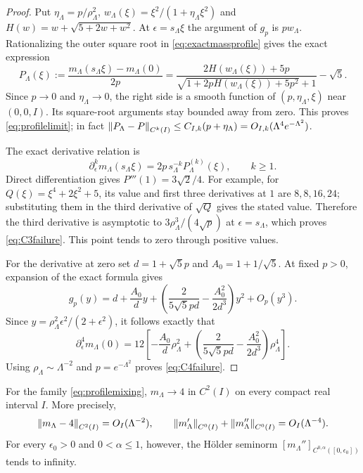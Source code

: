 \begin{proof}
Put $\eta_\Lambda=p/\rho_\Lambda^2$,
$w_\Lambda(\xi)=\xi^2/(1+\eta_\Lambda\xi^2)$ and
$H(w)=w+\sqrt{5+2w+w^2}$.
At $\epsilon=s_\Lambda\xi$ the argument of $g_p$ is $pw_\Lambda$.
Rationalizing the outer square root in \eqref{eq:exactmassprofile}
gives the exact expression
\begin{equation}\label{eq:rationalprofile}
 P_\Lambda(\xi):=\frac{m_\Lambda(s_\Lambda\xi)-m_\Lambda(0)}{2p}
 =\frac{2H(w_\Lambda(\xi))+5p}
        {\sqrt{1+2pH(w_\Lambda(\xi))+5p^2}+1}-\sqrt5.
\end{equation}
Since $p\to0$ and $\eta_\Lambda\to0$, the right side is a smooth
function of $(p,\eta_\Lambda,\xi)$ near $(0,0,I)$.
Its square-root arguments stay bounded away from zero.
This proves \eqref{eq:profilelimit}; in fact
$\left\lVert P_\Lambda-P\right\rVert_{C^k(I)}
\leq C_{I,k}(p+\eta_\Lambda)=O_{I,k}(\Lambda^4e^{-\Lambda^2})$.

The exact derivative relation is
\[
 \partial_\epsilon^k m_\Lambda(s_\Lambda\xi)
 =2p\,s_\Lambda^{-k}P_\Lambda^{(k)}(\xi),\qquad k\geq1.
\]
Direct differentiation gives $P'''(1)=3\sqrt2/4$.
For example, for $Q(\xi)=\xi^4+2\xi^2+5$, its value and first three
derivatives at $1$ are $8,8,16,24$; substituting them in the third
derivative of $\sqrt Q$ gives the stated value.
Therefore the third derivative is asymptotic to
$3\rho_\Lambda^3/(4\sqrt p)$ at $\epsilon=s_\Lambda$, which proves
\eqref{eq:C3failure}. This point tends to zero through positive values.

For the derivative at zero set $d=1+\sqrt5p$ and $A_0=1+1/\sqrt5$.
At fixed $p>0$, expansion of the exact formula gives
\[
 g_p(y)=d+\frac{A_0}{d}y+
 \left(\frac{2}{5\sqrt5pd}-\frac{A_0^2}{2d^3}\right)y^2+O_p(y^3).
\]
Since $y=\rho_\Lambda^2\epsilon^2/(2+\epsilon^2)$, it follows exactly that
\[
 \partial_\epsilon^4m_\Lambda(0)
 =12\left[-\frac{A_0}{d}\rho_\Lambda^2+
 \left(\frac{2}{5\sqrt5pd}-\frac{A_0^2}{2d^3}\right)\rho_\Lambda^4\right].
\]
Using $\rho_\Lambda\sim\Lambda^{-2}$ and $p=e^{-\Lambda^2}$ proves
\eqref{eq:C4failure}.
\end{proof}

\begin{corollary}\label{cor:sharpregularity}
For the family \eqref{eq:profilemixing}, $m_\Lambda\to4$ in $C^2(I)$
on every compact real interval $I$. More precisely,
\[
 \left\lVert m_\Lambda-4\right\rVert_{C^2(I)}=O_I(\Lambda^{-2}),\qquad
 \left\lVert m_\Lambda'\right\rVert_{C^0(I)}+\left\lVert m_\Lambda''\right\rVert_{C^0(I)}
 =O_I(\Lambda^{-4}).
\]
For every $\epsilon_0>0$ and $0<\alpha\leq1$, however,
the H\"older seminorm
$[m_\Lambda'']_{C^{0,\alpha}([0,\epsilon_0])}$ tends to infinity.
\end{corollary}

